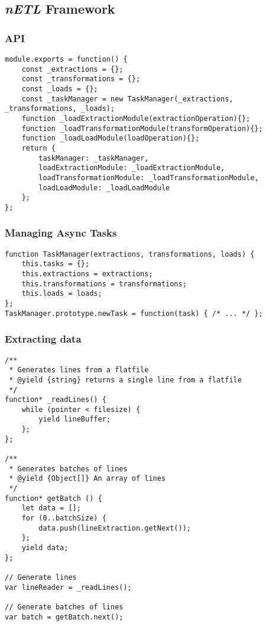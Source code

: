 \subsection{\textit{nETL} Framework}

\subsubsection*{API}
\label{appendix:netl-main}
\begin{verbatim}
module.exports = function() {
    const _extractions = {};
    const _transformations = {};
    const _loads = {};        
    const _taskManager = new TaskManager(_extractions, _transformations, _loads);
    function _loadExtractionModule(extractionOperation){};
    function _loadTransformationModule(transformOperation){};
    function _loadLoadModule(loadOperation){};
    return {
        taskManager: _taskManager,
        loadExtractionModule: _loadExtractionModule,
        loadTransformationModule: _loadTransformationModule,
        loadLoadModule: _loadLoadModule
    };
};
\end{verbatim}

\subsubsection{Managing Async Tasks}
\label{appendix:netl-taskmanager}
\begin{verbatim}
function TaskManager(extractions, transformations, loads) {
    this.tasks = {};
    this.extractions = extractions;
    this.transformations = transformations;
    this.loads = loads;
};
TaskManager.prototype.newTask = function(task) { /* ... */ };
\end{verbatim}

\subsubsection{Extracting data}
\label{appendix:netl-extraction}
\begin{verbatim}
/**
 * Generates lines from a flatfile
 * @yield {string} returns a single line from a flatfile
 */
function* _readLines() {
    while (pointer < filesize) {
        yield lineBuffer;
    };
};

/**
 * Generates batches of lines
 * @yield {Object[]} An array of lines
 */
function* getBatch () {
    let data = [];
    for (0..batchSize) {
        data.push(lineExtraction.getNext());
    };
    yield data;
};

// Generate lines
var lineReader = _readLines();

// Generate batches of lines
var batch = getBatch.next();
\end{verbatim}

